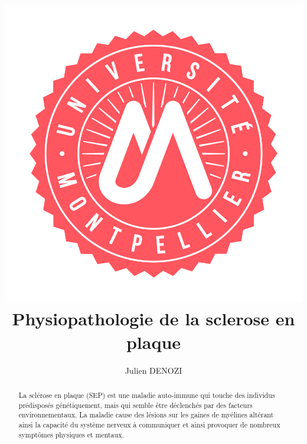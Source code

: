 \documentclass{comjnl}
\begin{document}
\title[Physiopathologie de la sclerose en plaque]{\includegraphics[scale=0.09]{logo.png} \\ Physiopathologie de la sclerose en plaque}
\author{Julien DENOZI}
 

 






\begin{abstract}
La sclérose en plaque (SEP) est une maladie auto-immune qui touche des individus prédisposés génétiquement, mais qui semble être déclenchés par des facteurs environnementaux. La maladie cause des lésions sur les gaines de myélines altérant ainsi la capacité du système nerveux à communiquer  et ainsi provoquer de nombreux symptômes physiques et mentaux.

\end{abstract}
\end{document}
